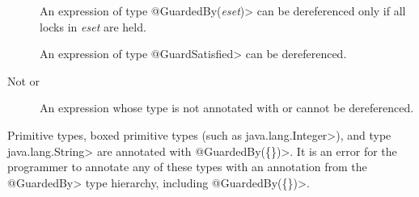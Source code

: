 
\begin{description}

\item[]
  An expression of type \<@GuardedBy(\emph{eset})> can be dereferenced only
  if all locks in \emph{eset} are held.

\item[]
  An expression of type \<@GuardSatisfied> can be dereferenced.

\item[Not  or ]
  An expression whose type is not annotated with  or
   cannot be dereferenced.

\end{description}


Primitive types, boxed primitive types (such as \<java.lang.Integer>), and type \<java.lang.String>
are annotated with \<@GuardedBy(\{\})>.
It is an error for the programmer to annotate any of these types with an annotation from
the \<@GuardedBy> type hierarchy, including \<@GuardedBy(\{\})>.



